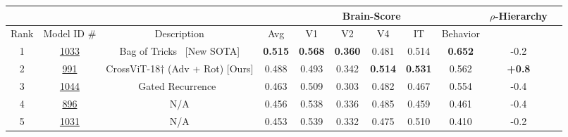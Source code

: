 \documentclass{article} %
\newcommand{\BlueM}{\textcolor{BlueModel}}
\newcommand{\record}{\textcolor{BlueModel2}}
\begin{document}
\begin{table}[t!]
\footnotesize
\centering
\begin{adjustbox}{width=\textwidth}

 \begin{tabular}{|c|c|c|c|c|c|c|c|c|c|c|} 
 \hline
 \multicolumn{3}{|c|}{} & \multicolumn{6}{|c|}{Brain-Score} & $\rho$-Hierarchy\\
 \hline
  Rank & Model ID \# & Description & Avg & V1 & V2 & V4 & IT & Behavior & \\
  \hline
  1 & \href{http://www.brain-score.org/model/1033}{1033} & Bag of Tricks~\citep{riedel2022bag} [New SOTA] & \textbf{\record{0.515}} & \textbf{0.568} & \textbf{0.360} & 0.481 & 0.514 & \textbf{0.652} & -0.2\\ 
 2 & \href{http://www.brain-score.org/competition/#leaderboard}{991} & \BlueM{CrossViT-18$\dagger$ (Adv + Rot) [Ours]} & 0.488 & 0.493 & 0.342 & \textbf{\record{0.514}} & \textbf{0.531} & 0.562 & \textbf{+0.8}\\ 
 
  3 & \href{http://www.brain-score.org/model/1044}{1044} & Gated Recurrence~\citep{azeglio2022improving} & 0.463 & 0.509 & 0.303 & 0.482 & 0.467 & 0.554 & -0.4\\ 
 4 & \href{http://www.brain-score.org/model/896}{896} & N/A & 0.456 & 0.538 & 0.336 & 0.485 & 0.459 & 0.461 & -0.4\\ 
  5 & \href{http://www.brain-score.org/model/1031}{1031} & N/A & 0.453 & 0.539 & 0.332 & 0.475 & 0.510 & 0.410 & -0.2\\ \hline
\end{tabular}\
\end{adjustbox}
 


\end{table}
\end{document}
